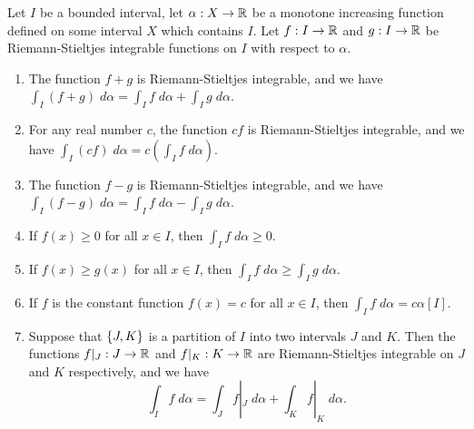 \begin{ac}\label{i:ac:11.8.11}
  Let \(I\) be a bounded interval, let \(\alpha : X \to \mathbb{R}\) be a monotone increasing function defined on some interval \(X\) which contains \(I\).
  Let \(f : I \to \mathbb{R}\) and \(g : I \to \mathbb{R}\) be Riemann-Stieltjes integrable functions on \(I\) with respect to \(\alpha\).
  \begin{enumerate}
    \item The function \(f + g\) is Riemann-Stieltjes integrable, and we have \(\int_I (f + g) \; d \alpha = \int_I f \; d \alpha + \int_I g \; d \alpha\).
    \item For any real number \(c\), the function \(cf\) is Riemann-Stieltjes integrable, and we have \(\int_I (cf) \; d \alpha = c(\int_I f \; d \alpha)\).
    \item The function \(f - g\) is Riemann-Stieltjes integrable, and we have \(\int_I (f - g) \; d \alpha = \int_I f \; d \alpha - \int_I g \; d \alpha\).
    \item If \(f(x) \geq 0\) for all \(x \in I\), then \(\int_I f \; d \alpha \geq 0\).
    \item If \(f(x) \geq g(x)\) for all \(x \in I\), then \(\int_I f \; d \alpha \geq \int_I g \; d \alpha\).
    \item If \(f\) is the constant function \(f(x) = c\) for all \(x \in I\), then \(\int_I f \; d \alpha = c \alpha[I]\).
    \item Suppose that \(\left\lbrace J, K\right\rbrace\) is a partition of \(I\) into two intervals \(J\) and \(K\).
          Then the functions \(f|_J : J \to \mathbb{R}\) and \(f|_K : K \to \mathbb{R}\) are Riemann-Stieltjes integrable on \(J\) and \(K\) respectively, and we have
          \[
            \int_I f \; d \alpha = \int_J f|_J \; d \alpha + \int_K f|_K \; d \alpha.
          \]
  \end{enumerate}
\end{ac}

